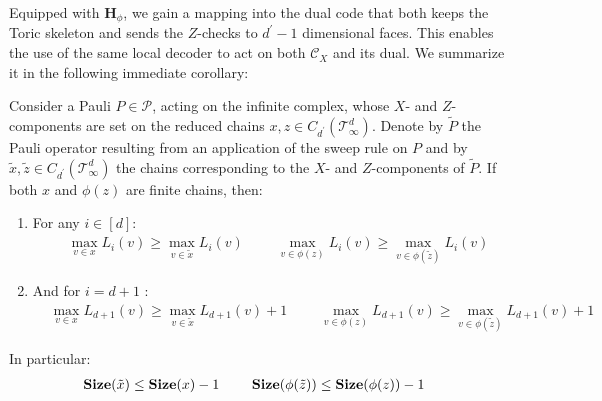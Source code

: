 Equipped with $\mathbf{H}_{\phi}$, we gain a mapping into the dual code that both keeps the Toric skeleton and sends the $Z$-checks to $d^{\prime}-1$ dimensional faces. This enables the use of the same local decoder to act on both $\mathcal{C}_{X}$ and its dual. We summarize it in the following immediate corollary:
\begin{corollary}
\label{claim:polesmove}  
Consider a Pauli $P \in \mathcal{P}$, acting on the infinite complex, whose $X$- and $Z$-components are set on the reduced chains $x, z \in C_{d^{\prime}}(\mathcal T_\infty^d)$. Denote by $\tilde{P}$ the Pauli operator resulting from an application of the sweep rule on $P$ and by $\tilde{x}, \tilde{z} \in C_{d^{\prime}}(\mathcal T_\infty^d)$ the chains corresponding to the $X$- and $Z$-components of $\tilde{P}$. If both $x$ and $\phi(z)$ are finite chains, then:
  \begin{enumerate}
    \item For any $i \in [d]$: 
      \begin{equation*}
        \begin{split}
          & \max_{v \in x} L_{i}(v)  \ge \max_{v \in \tilde{x}} L_{i}(v) \, \quad \quad \, \max_{v \in \phi(z)} L_{i}(v)  \ge \max_{v \in \phi(\tilde{z}) } L_{i}(v) 
      \end{split}
      \end{equation*}
    \item And for $i = d+1$ : 
      \begin{equation*}
        \begin{split}
          & \max_{v \in x} L_{d+1}(v)  \ge \max_{v \in \tilde{x}} L_{d+1}(v) + 1 \, \quad \quad \,            \max_{v \in \phi(z)} L_{d+1}(v)  \ge \max_{v \in \phi(\tilde{z}) } L_{d+1}(v) + 1
        \end{split}
      \end{equation*}
  \end{enumerate}
  In particular: 
  \begin{equation*}
    \begin{split}
      &\mathbf{Size}(\tilde{x})  \le \mathbf{Size}(x)  - 1 \, \quad \quad \,   \mathbf{Size}( \phi(\tilde{z} ) )  \le \mathbf{Size}( \phi(z) ) - 1 
    \end{split}
  \end{equation*}
\end{corollary}



